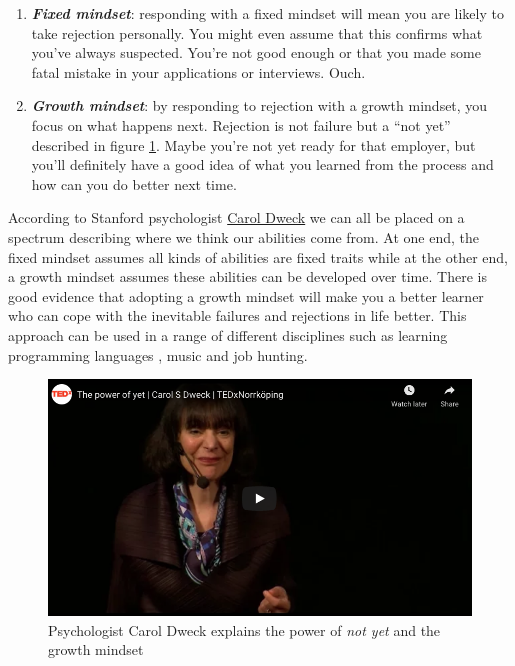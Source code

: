 \documentclass[
]{book}
\providecommand{\tightlist}{%
  \setlength{\itemsep}{0pt}\setlength{\parskip}{0pt}}
\begin{document}
\begin{enumerate}
\def\labelenumi{\arabic{enumi}.}
\tightlist
\item
  \textbf{\emph{Fixed mindset}}: responding with a fixed mindset will mean you are likely to take rejection personally. You might even assume that this confirms what you've always suspected. You're not good enough or that you made some fatal mistake in your applications or interviews. Ouch.
\item
  \textbf{\emph{Growth mindset}}: by responding to rejection with a growth mindset, you focus on what happens next. Rejection is not failure but a ``not yet'' described in figure \ref{fig:not-fig}. Maybe you're not yet ready for that employer, but you'll definitely have a good idea of what you learned from the process and how can you do better next time.
\end{enumerate}

According to Stanford psychologist \href{https://en.wikipedia.org/wiki/Carol_Dweck}{Carol Dweck} we can all be placed on a spectrum describing where we think our abilities come from. At one end, the fixed mindset assumes all kinds of abilities are fixed traits while at the other end, a growth mindset assumes these abilities can be developed over time. \citep{dweck} There is good evidence that adopting a growth mindset will make you a better learner who can cope with the inevitable failures and rejections in life better. This approach can be used in a range of different disciplines such as learning programming languages \citep{Cutts2010}, music \citep{Davis2016} and job hunting.

\begin{figure}

{\centering \includegraphics[width=0.99\linewidth]{images/youtube-dweck} 

}

\caption{Psychologist Carol Dweck explains the power of \emph{not yet} and the growth mindset \citep{youtube-dweck}}\label{fig:not-fig}
\end{figure}
\end{document}
